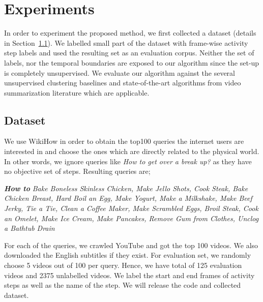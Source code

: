 \section{Experiments}
In order to experiment the proposed method, we first collected a dataset (details in Section~\ref{dataset:sec}). We labelled small part of the dataset with frame-wise activity step labels and used the resulting set as an evaluation corpus. Neither the set of labels, nor the temporal boundaries are exposed to our algorithm since the set-up is completely unsupervised. We evaluate our algorithm against the several unsupervised clustering baselines and state-of-the-art algorithms from video summarization literature which are applicable.
\subsection{Dataset}
\label{dataset:sec}
We use WikiHow\cite{wikiHow} in order to obtain the top100 queries the internet users are interested in and choose the ones which are directly related to the physical world. In other words, we ignore queries like \emph{How to get over a break up‏?‎} as they have no objective set of steps. Resulting queries are;


\emph{\textbf{How to}}\footnotesize
\emph{Bake Boneless Skinless Chicken, Make Jello Shots, Cook Steak, Bake Chicken Breast, Hard Boil an Egg, Make Yogurt, Make a Milkshake, Make Beef Jerky, Tie a Tie, Clean a Coffee Maker, Make Scrambled Eggs, Broil Steak, Cook an Omelet, Make Ice Cream, Make Pancakes, Remove Gum from Clothes, Unclog a Bathtub Drain}
\normalsize

For each of the queries, we crawled YouTube and got the top 100 videos. We also downloaded the English subtitles if they exist. For evaluation set, we randomly choose 5 videos out of 100 per query. Hence, we have total of 125 evaluation videos and 2375 unlabelled videos. We label the start and end frames of activity steps as well as the name of the step. We will release the code and collected dataset.

